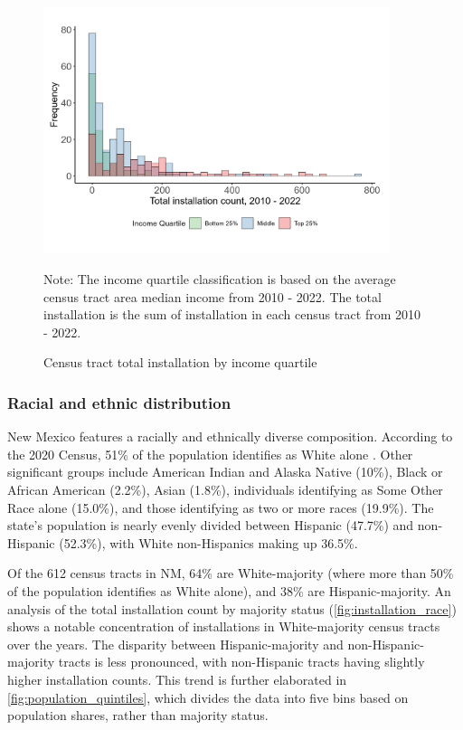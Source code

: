 \documentclass[11pt,twoside,letterpaper]{article}
\begin{document}
\begin{figure}[!ht]
    \centering
\includegraphics[width=0.9\textwidth]{figures/comparative_histogram_installation.png}
    \caption{Census tract total installation by income quartile}
    \label{fig:comparative_histogram_installation}
        \begin{flushleft}
        \footnotesize Note: The income quartile classification is based on the average census tract area median income from 2010 - 2022. The total installation is the sum of installation in each census tract from 2010 - 2022.  
    \end{flushleft}
\end{figure}

\subsubsection{Racial and ethnic distribution}

New Mexico features a racially and ethnically diverse composition. According to the 2020 Census, 51\% of the population identifies as White alone \parencite{uscensus2020}. Other significant groups include American Indian and Alaska Native (10\%), Black or African American (2.2\%), Asian (1.8\%), individuals identifying as Some Other Race alone (15.0\%), and those identifying as two or more races (19.9\%). The state’s population is nearly evenly divided between Hispanic (47.7\%) and non-Hispanic (52.3\%), with White non-Hispanics making up 36.5\%.

Of the 612 census tracts in NM, 64\% are White-majority (where more than 50\% of the population identifies as White alone), and 38\% are Hispanic-majority. An analysis of the total installation count by majority status (\autoref{fig:installation_race}) shows a notable concentration of installations in White-majority census tracts over the years. The disparity between Hispanic-majority and non-Hispanic-majority tracts is less pronounced, with non-Hispanic tracts having slightly higher installation counts. This trend is further elaborated in \autoref{fig:population_quintiles}, which divides the data into five bins based on population shares, rather than majority status.
\end{document}
